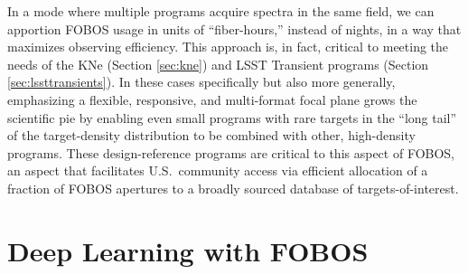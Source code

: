 \documentclass[11pt,a4paper,twoside,onecolumn,openany,final,oldfontcommands]{memoir}
\begin{document}
In a mode where multiple programs acquire spectra in the same field, we can apportion FOBOS usage in units of ``fiber-hours,'' instead of nights, in a way that maximizes observing efficiency.  This approach is, in fact, critical to meeting the needs of the KNe (Section \ref{sec:kne}) and LSST Transient programs (Section \ref{sec:lssttransients}).  In these cases specifically but also more generally, emphasizing a flexible, responsive, and multi-format focal plane grows the scientific pie by enabling even small programs with rare targets in the ``long tail'' of the target-density distribution to be combined with other, high-density programs.  These design-reference programs are critical to this aspect of FOBOS, an aspect that facilitates U.S.\ community access via efficient allocation of a fraction of FOBOS apertures to a broadly sourced database of targets-of-interest.



\section{Deep Learning with FOBOS}
\label{sec:ML}
\end{document}
